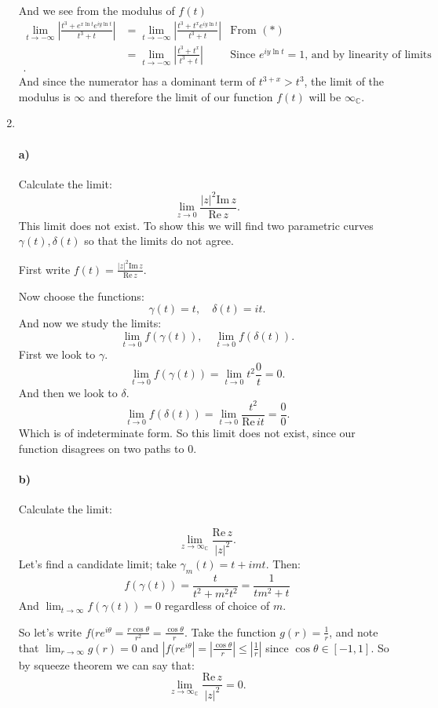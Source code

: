\documentclass{article}
\begin{document}
\begin{enumerate}
        And we see from the modulus of $f(t)$ 
        \begin{align*}
            \lim_{t \to -\infty} \left|\frac{t^3+e^{x\ln t}e^{iy\ln t}}{t^3+t}\right|&=\lim_{t \to -\infty}\left| \frac{t^3+t^{x}e^{iy\ln t}}{t^3+t}\right|&\text{From }(*)\\
            &= \lim_{t \to -\infty} \left| \frac{t^3+t ^{x}}{t^3+t} \right| &\text{Since }e^{iy\ln t}=1 \text{, and by linearity of limits} \\
        .\end{align*}
        And since the numerator has a dominant term of $t ^{3+x}>t^{3}$, the limit of the modulus is $\infty$ and therefore the limit of our function $f(t)$ will be $\infty_{\mathbb{C}}$.


        \newpage
    
    \item\, \paragraph*{a)} 
        Calculate the limit:
        \[
        \lim_{z \to 0} \frac{|z|^2 \mathrm{Im}\, z}{\mathrm{Re}\, z}
        .\] 
        This limit does not exist. To show this we will find two parametric curves 
        $\gamma(t), \delta(t)$ so that the limits do not agree.

        First write $f(t)=\frac{|z|^2 \mathrm{Im}\, z}{\mathrm{Re}\, z}$.

        Now choose the functions:
        \[
        \gamma(t) = t,\quad \delta(t)= it
        .\] 
        And now we study the limits:
        \[
        \lim_{t \to 0} f(\gamma(t)),\quad \lim_{t \to 0}f(\delta(t)) 
        .\] 
        First we look to $\gamma$.
        \[
        \lim_{t \to 0} f(\gamma(t))=\lim_{t \to 0} t^2 \frac{0}{t}=0
        .\] 
        And then we look to $\delta$.
        \[
        \lim_{t \to 0} f(\delta(t))=\lim_{t \to 0} \frac{t^2}{\mathrm{Re}\,it}= \frac{0}{0}
        .\] 
        Which is of indeterminate form. So this limit does not exist, since our function disagrees
        on two paths to $0$.

        \paragraph*{b)}
        Calculate the limit:

        \[
        \lim_{z \to \infty_{\mathbb{C}}} \frac{\mathrm{Re}\,z}{|z|^2}
        .\] 
        Let's find a candidate limit; take $\gamma_m(t)=t+imt$. Then:
        $$f(\gamma(t))=\frac{t}{t^2+m^2t^2}=\frac{1}{tm^2+t}$$
        And $\lim_{t \to \infty} f(\gamma(t))=0 $ regardless of choice of $m$.

        So let's write $f(re^{i\theta}=\frac{r\cos\theta}{r^2}=\frac{\cos\theta}{r}$.
        Take the function $g(r)=\frac{1}{r}$, and note that $\lim_{r \to \infty} g(r)=0$ and
        $|f(re^{i\theta}|=\left|\frac{\cos\theta}{r}\right|\leq \left|\frac{1}{r}\right|$ since $\cos\theta\in [-1,1]$. So by squeeze theorem we can say that:
        \[
        \lim_{z \to \infty_{\mathbb{C}}} \frac{\mathrm{Re}\,z}{|z|^2}=0
        .\] 

\end{enumerate}
\end{document}
